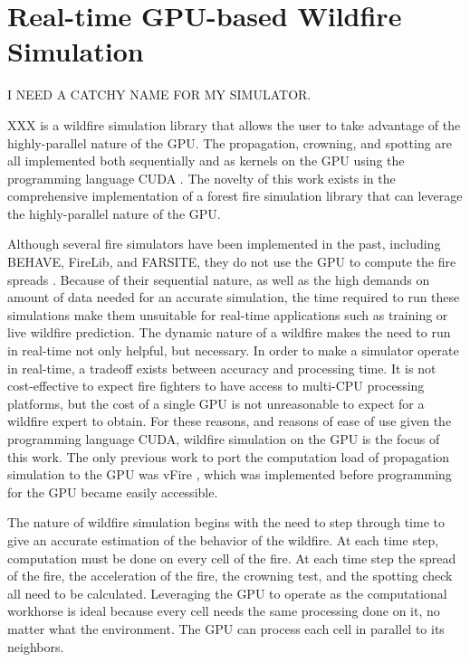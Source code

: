 \chapter{Real-time GPU-based Wildfire Simulation}
\label{chapter:gpuSim}
I NEED A CATCHY NAME FOR MY SIMULATOR. 

XXX is a wildfire simulation library that allows the user to take advantage of the highly-parallel nature of the GPU. The propagation, crowning, and spotting are all implemented both sequentially and as kernels on the GPU using the programming language CUDA \cite{cuda}. The novelty of this work exists in the comprehensive implementation of a forest fire simulation library that can leverage the highly-parallel nature of the GPU. 

Although several fire simulators have been implemented in the past, including BEHAVE, FireLib, and FARSITE, they do not use the GPU to compute the fire spreads \cite{fireLib}\cite{BEHAVE}\cite{FARSITE}. Because of their sequential nature, as well as the high demands on amount of data needed for an accurate simulation, the time required to run these simulations make them unsuitable for real-time applications such as training or live wildfire prediction. The dynamic nature of a wildfire makes the need to run in real-time not only helpful, but necessary. In order to make a simulator operate in real-time, a tradeoff exists between accuracy and processing time. It is not cost-effective to expect fire fighters to have access to multi-CPU processing platforms, but the cost of a single GPU is not unreasonable to expect for a wildfire expert to obtain. For these reasons, and reasons of ease of use given the programming language CUDA, wildfire simulation on the GPU is the focus of this work. The only previous work to port the computation load of propagation simulation to the GPU was vFire \cite{vFire}, which was implemented before programming for the GPU became easily accessible. 

The nature of wildfire simulation begins with the need to step through time to give an accurate estimation of the behavior of the wildfire. At each time step, computation must be done on every cell of the fire. At each time step the spread of the fire, the acceleration of the fire, the crowning test, and the spotting check all need to be calculated. Leveraging the GPU to operate as the computational workhorse is ideal because every cell needs the same processing done on it, no matter what the environment. The GPU can process each cell in parallel to its neighbors. 

